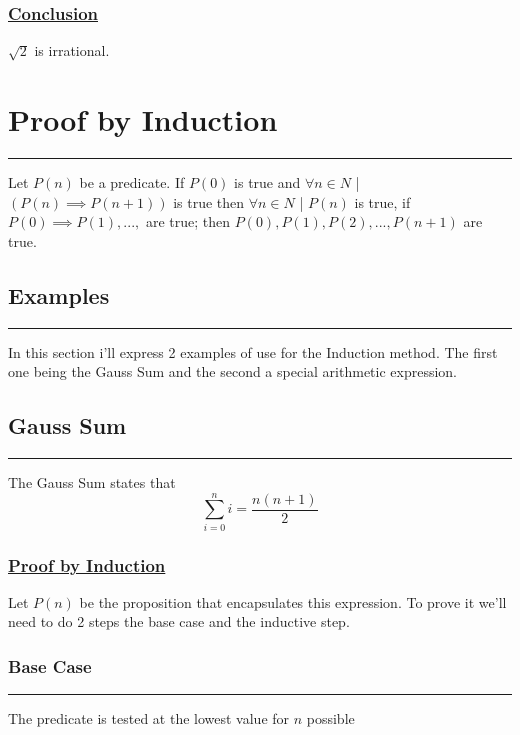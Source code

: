 \documentclass{article}
\begin{document}
\subsubsection*{\underline{Conclusion}}

$\sqrt{2}$ is irrational.

\section{Proof by Induction}
\hrule
\vspace{0.2cm}
Let $P(n)$ be a predicate. If $P(0)$
is true and $\forall n \in N$ |
$(P(n) \implies P(n+1))$ is true then
$\forall n \in N$ | $P(n)$ is true, if
$P(0) \implies P(1), ...,$ are true;
then $P(0), P(1), P(2), ..., P(n+1)$ are true.

\vspace{0.2cm}
\noindent
\subsection*{Examples}
\hrule
\vspace{0.2cm}

In this section i'll express 2 examples
of use for the Induction method.
The first one being the Gauss Sum and the second
a special arithmetic expression.

\newpage
\subsection{Gauss Sum}
\vspace{0.2cm}
\hrule
\vspace{0.2cm}
The Gauss Sum states that \[
\sum_{i=0}^{n} i = \frac{n(n+1)}{2}\]

\vspace{0.2cm}
\subsubsection*{\underline{Proof by Induction}}
\vspace{0.2cm}

Let $P(n)$ be the proposition that 
encapsulates this expression. 
To prove it we'll need to do 2 steps
the base case and the inductive step.

\subsubsection*{Base Case}
\hrule
\vspace{0.2cm}
The predicate is tested at the lowest
value for $n$ possible
\end{document}

